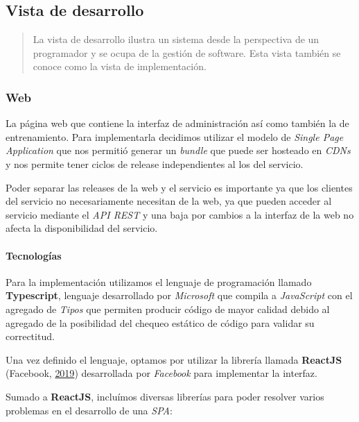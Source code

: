 \documentclass[12pt,a4paper,]{scrartcl}
\let\oldparagraph\paragraph
\renewcommand{\paragraph}[1]{\oldparagraph{#1}\mbox{}}
\begin{document}
\hypertarget{vista-de-desarrollo}{%
\subsection{Vista de desarrollo}\label{vista-de-desarrollo}}

\begin{quote}
La vista de desarrollo ilustra un sistema desde la perspectiva de un programador y se ocupa de la gestión de software.
Esta vista también se conoce como la vista de implementación.
\end{quote}

\hypertarget{web-1}{%
\subsubsection{Web}\label{web-1}}

La página web que contiene la interfaz de administración así como también la de entrenamiento. Para implementarla decidimos utilizar el modelo de \emph{Single Page Application} que nos permitió generar un \emph{bundle} que puede ser hosteado en \emph{CDNs} y nos permite tener ciclos de release independientes al los del servicio.

Poder separar las releases de la web y el servicio es importante ya que los clientes del servicio no necesariamente necesitan de la web, ya que pueden acceder al servicio mediante el \emph{API REST} y una baja por cambios a la interfaz de la web no afecta la disponibilidad del servicio.

\hypertarget{tecnologuxedas}{%
\paragraph{Tecnologías}\label{tecnologuxedas}}

Para la implementación utilizamos el lenguaje de programación llamado \textbf{Typescript}, lenguaje desarrollado por \emph{Microsoft} que compila a \emph{JavaScript} con el agregado de \emph{Tipos} que permiten producir código de mayor calidad debido al agregado de la posibilidad del chequeo estático de código para validar su correctitud.

Una vez definido el lenguaje, optamos por utilizar la librería llamada \textbf{ReactJS} (Facebook, \protect\hyperlink{ref-react}{2019}) desarrollada por \emph{Facebook} para implementar la interfaz.

Sumado a \textbf{ReactJS}, incluímos diversas librerías para poder resolver varios problemas en el desarrollo de una \emph{SPA}:
\end{document}
